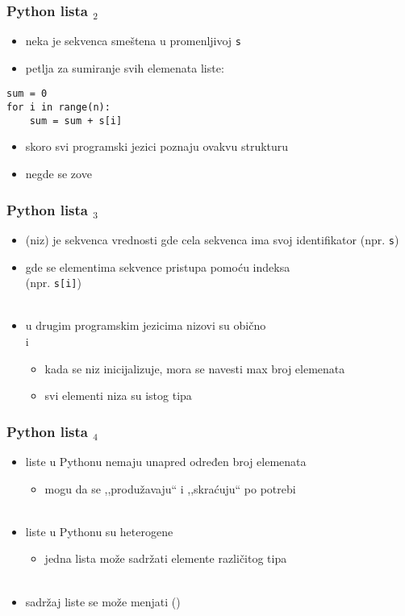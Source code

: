 \documentclass[utf8,compress]{beamer}
\begin{document}
\begin{frame}[fragile]
  \frametitle{Python lista $_2$}
  \begin{itemize}
    \item neka je sekvenca smeštena u promenljivoj \texttt{s}
    \item petlja za sumiranje svih elemenata liste:
  \end{itemize}
\begin{verbatim}
sum = 0
for i in range(n):
    sum = sum + s[i]
\end{verbatim}
  \begin{itemize}
    \item skoro svi programski jezici poznaju ovakvu strukturu
    \item negde se zove 
  \end{itemize}
\end{frame}

\begin{frame}[fragile]
  \frametitle{Python lista $_3$}
  \begin{itemize}
    \item {} (niz) je sekvenca vrednosti gde cela sekvenca ima svoj identifikator (npr. \texttt{s})
    \item gde se elementima sekvence pristupa pomoću indeksa \\(npr. \texttt{s[i]}) \\ \ \\
    \item u drugim programskim jezicima nizovi su obično  \\i {}
    \begin{itemize}
      \item kada se niz inicijalizuje, mora se navesti max broj elemenata
      \item svi elementi niza su istog tipa
    \end{itemize}
  \end{itemize}
\end{frame}

\begin{frame}[fragile]
  \frametitle{Python lista $_4$}
  \begin{itemize}
    \item liste u Pythonu nemaju unapred određen broj elemenata
    \begin{itemize}
      \item mogu da se ,,produžavaju`` i ,,skraćuju`` po potrebi \\ \ \\
    \end{itemize}
    \item liste u Pythonu su heterogene
    \begin{itemize}
      \item jedna lista može sadržati elemente različitog tipa \\ \ \\
    \end{itemize}
    \item sadržaj liste se može menjati ()
  \end{itemize}
\end{frame}
\end{document}
